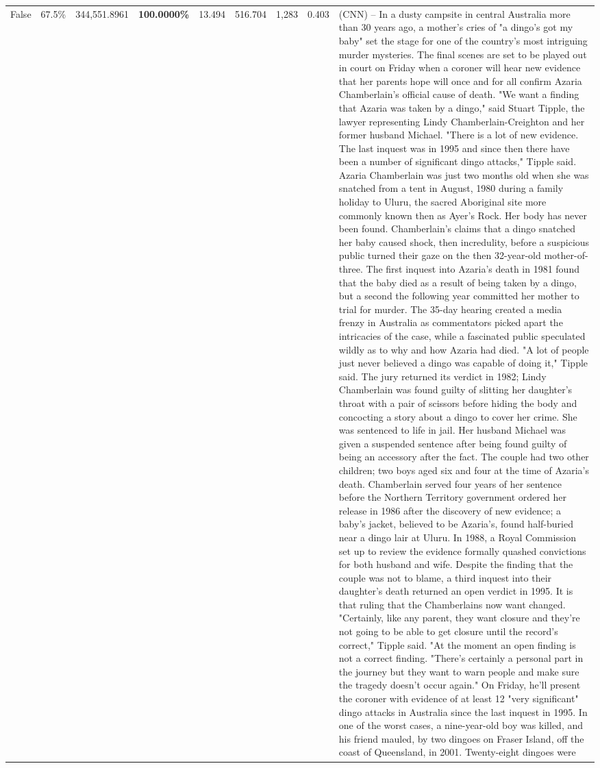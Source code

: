 \begin{table}[H]
\begin{tabular}{lllrlllll}
False & 67.5\% & 344,551.8961 & \bfseries \color{red} 100.0000\% & 13.494 & 516.704 & 1,283 & 0.403 & (CNN) -- In a dusty campsite in central Australia more than 30 years ago, a mother's cries of "a dingo's got my baby" set the stage for one of the country's most intriguing murder mysteries. The final scenes are set to be played out in court on Friday when a coroner will hear new evidence that her parents hope will once and for all confirm Azaria Chamberlain's official cause of death. "We want a finding that Azaria was taken by a dingo," said Stuart Tipple, the lawyer representing Lindy Chamberlain-Creighton and her former husband Michael. "There is a lot of new evidence. The last inquest was in 1995 and since then there have been a number of significant dingo attacks," Tipple said. Azaria Chamberlain was just two months old when she was snatched from a tent in August, 1980 during a family holiday to Uluru, the sacred Aboriginal site more commonly known then as Ayer's Rock. Her body has never been found. Chamberlain's claims that a dingo snatched her baby caused shock, then incredulity, before a suspicious public turned their gaze on the then 32-year-old mother-of-three. The first inquest into Azaria's death in 1981 found that the baby died as a result of being taken by a dingo, but a second the following year committed her mother to trial for murder. The 35-day hearing created a media frenzy in Australia as commentators picked apart the intricacies of the case, while a fascinated public speculated wildly as to why and how Azaria had died. "A lot of people just never believed a dingo was capable of doing it," Tipple said. The jury returned its verdict in 1982; Lindy Chamberlain was found guilty of slitting her daughter's throat with a pair of scissors before hiding the body and concocting a story about a dingo to cover her crime. She was sentenced to life in jail. Her husband Michael was given a suspended sentence after being found guilty of being an accessory after the fact. The couple had two other children; two boys aged six and four at the time of Azaria's death. Chamberlain served four years of her sentence before the Northern Territory government ordered her release in 1986 after the discovery of new evidence; a baby's jacket, believed to be Azaria's, found half-buried near a dingo lair at Uluru. In 1988, a Royal Commission set up to review the evidence formally quashed convictions for both husband and wife. Despite the finding that the couple was not to blame, a third inquest into their daughter's death returned an open verdict in 1995. It is that ruling that the Chamberlains now want changed. "Certainly, like any parent, they want closure and they're not going to be able to get closure until the record's correct," Tipple said. "At the moment an open finding is not a correct finding. "There's certainly a personal part in the journey but they want to warn people and make sure the tragedy doesn't occur again." On Friday, he'll present the coroner with evidence of at least 12 "very significant" dingo attacks in Australia since the last inquest in 1995. In one of the worst cases, a nine-year-old boy was killed, and his friend mauled, by two dingoes on Fraser Island, off the coast of Queensland, in 2001. Twenty-eight dingoes were 
\end{tabular}
\end{table}
